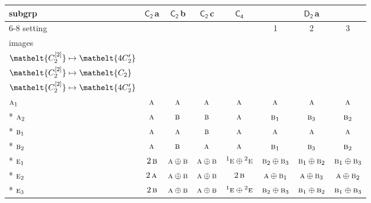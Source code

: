 \documentclass[10pt,a4paper]{article}
\numberwithin{equation}{section}
\newcommand{\eltfont}[1]{{\let\sigma\eltsigma\mathelt{#1}}}
\newcommand{\grp}[1]{\mathsf{#1}}
\newcommand{\irr}[1]{\text{\normalfont\scshape #1}}
\newcommand{\conjpair}[1]{{}^{#1}}
\newcommand{\cls}[1]{\eltfont{#1}}
\newcommand{\clsletter}[1]{\,{\scriptsize\color{black!55}#1}}
\newcommand{\genidx}[2]{#1^{[\mathrm{#2}]}}
\begin{document}
{\small\begin{longtable}{@{}lccccccc@{}}\toprule
subgrp & \href{C2.pdf}{$\grp{C_{2}}$}\clsletter{a} & \href{C2.pdf}{$\grp{C_{2}}$}\clsletter{b} & \href{C2.pdf}{$\grp{C_{2}}$}\clsletter{c} & \href{C4.pdf}{$\grp{C_{4}}$} & \multicolumn{3}{c}{\href{D2.pdf}{$\grp{D_{2}}$}\clsletter{a}}\\\cmidrule(lr){6-8}
setting &  &  &  &  & 1 & 2 & 3\\
images &  &  &  &  & {\scriptsize\begin{tabular}[t]{@{}c@{}}$\cls{\genidx{C_{2}}{1}} \mapsto \cls{C_{2}}$\\$\cls{\genidx{C_{2}}{2}} \mapsto \cls{4C_{2}'}$\end{tabular}} & {\scriptsize\begin{tabular}[t]{@{}c@{}}$\cls{\genidx{C_{2}}{1}} \mapsto \cls{4C_{2}'}$\\$\cls{\genidx{C_{2}}{2}} \mapsto \cls{C_{2}}$\end{tabular}} & {\scriptsize\begin{tabular}[t]{@{}c@{}}$\cls{\genidx{C_{2}}{1}} \mapsto \cls{4C_{2}'}$\\$\cls{\genidx{C_{2}}{2}} \mapsto \cls{4C_{2}'}$\end{tabular}}\\\midrule\endhead
\bottomrule\endfoot\endlastfoot
$\irr{a}_{1}$ & $\irr{a}$ & $\irr{a}$ & $\irr{a}$ & $\irr{a}$ & $\irr{a}$ & $\irr{a}$ & $\irr{a}$\\*
$\irr{a}_{2}$ & $\irr{a}$ & $\irr{b}$ & $\irr{b}$ & $\irr{a}$ & $\irr{b}_{1}$ & $\irr{b}_{3}$ & $\irr{b}_{2}$\\*
$\irr{b}_{1}$ & $\irr{a}$ & $\irr{a}$ & $\irr{b}$ & $\irr{a}$ & $\irr{a}$ & $\irr{a}$ & $\irr{a}$\\*
$\irr{b}_{2}$ & $\irr{a}$ & $\irr{b}$ & $\irr{a}$ & $\irr{a}$ & $\irr{b}_{1}$ & $\irr{b}_{3}$ & $\irr{b}_{2}$\\*
$\irr{e}_{1}$ & $2\,\irr{b}$ & $\irr{a}\oplus \irr{b}$ & $\irr{a}\oplus \irr{b}$ & $\conjpair{1}\irr{e}\oplus \conjpair{2}\irr{e}$ & $\irr{b}_{2}\oplus \irr{b}_{3}$ & $\irr{b}_{1}\oplus \irr{b}_{2}$ & $\irr{b}_{1}\oplus \irr{b}_{3}$\\*
$\irr{e}_{2}$ & $2\,\irr{a}$ & $\irr{a}\oplus \irr{b}$ & $\irr{a}\oplus \irr{b}$ & $2\,\irr{b}$ & $\irr{a}\oplus \irr{b}_{1}$ & $\irr{a}\oplus \irr{b}_{3}$ & $\irr{a}\oplus \irr{b}_{2}$\\*
$\irr{e}_{3}$ & $2\,\irr{b}$ & $\irr{a}\oplus \irr{b}$ & $\irr{a}\oplus \irr{b}$ & $\conjpair{1}\irr{e}\oplus \conjpair{2}\irr{e}$ & $\irr{b}_{2}\oplus \irr{b}_{3}$ & $\irr{b}_{1}\oplus \irr{b}_{2}$ & $\irr{b}_{1}\oplus \irr{b}_{3}$\\
\bottomrule\end{longtable}}
\end{document}
